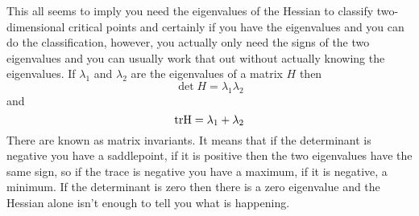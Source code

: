 \documentclass[12pt]{article}
\begin{document}
This all seems to imply you need the eigenvalues of the Hessian to
classify two-dimensional critical points and certainly if you have the
eigenvalues and you can do the classification, however, you actually
only need the signs of the two eigenvalues and you can usually work
that out without actually knowing the eigenvalues. If $\lambda_1$ and
$\lambda_2$ are the eigenvalues of a matrix $H$ then
\begin{equation}
  \det{H}=\lambda_1\lambda_2
\end{equation}
and
\begin{equation}
  \rm{tr}{H}=\lambda_1+\lambda_2
\end{equation}
There are known as matrix invariants. It means that if the determinant
is negative you have a saddlepoint, if it is positive then the two
eigenvalues have the same sign, so if the trace is negative you have a
maximum, if it is negative, a minimum. If the determinant is zero then
there is a zero eigenvalue and the Hessian alone isn't enough to tell
you what is happening.
\end{document}
